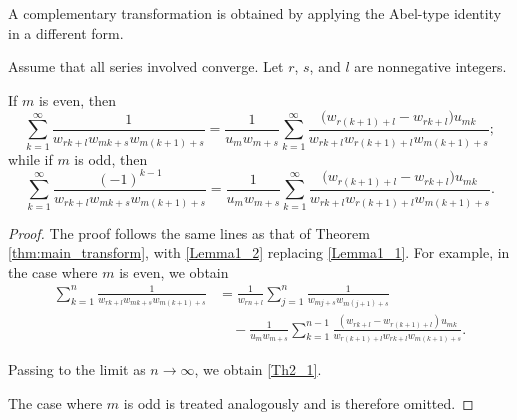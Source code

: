 \documentclass[12pt,reqno]{article}
\begin{document}
A complementary transformation is obtained by applying the Abel-type identity in a different form. 
\begin{theorem}\label{thm:second_transform}
	Assume that all series involved converge. Let $r$, $s$, and $l$ are nonnegative integers.
	
	If $m$ is even, then
		\begin{equation}\label{Th2_1}
		\sum_{k=1}^\infty 
		\frac{1}{w_{rk+l}w_{mk+s}w_{m(k+1)+s}} 
		= \frac{1}{u_m w_{m+s}}\sum_{k=1}^\infty 
		\frac{\big(w_{r(k+1)+l}- w_{rk+l}\big)u_{mk}}{w_{rk+l} w_{r(k+1)+l} w_{m(k+1)+s}};
		\end{equation}
	while if $m$ is odd, then
		\begin{equation}\label{Th2_2}
		\sum_{k=1}^\infty 
		\frac{(-1)^{k-1}}{w_{rk+l}w_{mk+s}w_{m(k+1)+s}} 
		= \frac{1}{u_m w_{m+s}}\sum_{k=1}^\infty 
		\frac{\big(w_{r(k+1)+l}- w_{rk+l}\big)u_{mk}}{w_{rk+l} w_{r(k+1)+l} w_{m(k+1)+s}}.
		\end{equation}
\end{theorem}
\begin{proof}
	The proof follows the same lines as that of Theorem \ref{thm:main_transform}, with \eqref{Lemma1_2} replacing \eqref{Lemma1_1}.
	For example, in the case where $m$ is even, we obtain
	\begin{align*}
		\sum_{k=1}^n
		\frac{1}{w_{rk+l}w_{mk+s}w_{m(k+1)+s}}
		&=
		\frac{1}{w_{rn+l}}
		\sum_{j=1}^n
		\frac{1}{w_{mj+s}w_{m(j+1)+s}}
		\\
		&\quad
		-\frac{1}{u_m w_{m+s}}
		\sum_{k=1}^{n-1}
		\frac{(w_{rk+l}-w_{r(k+1)+l})u_{mk}}
		{w_{r(k+1)+l}w_{rk+l}w_{m(k+1)+s}}.
		\end{align*}
	
	Passing to the limit as $n\to\infty$, we obtain \eqref{Th2_1}.
	
	The case where $m$ is odd is treated analogously and is therefore omitted.
\end{proof}
\end{document}
